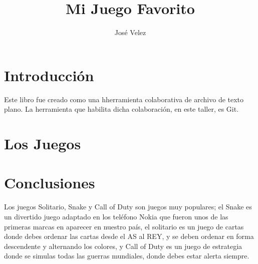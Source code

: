 \documentclass[12pt,oneside]{book}
\title{Mi Juego Favorito}
\author{José Velez}
\begin{document}
\maketitle
\tableofcontents

\chapter{Introducción}
Este libro fue creado como una hherramienta colaborativa de archivo de texto plano. La herramienta que habilita dicha colaboración, en este taller, es Git.

\chapter{Los Juegos}





\chapter{Conclusiones}
Los juegos Solitario, Snake y Call of Duty son juegos muy populares; el Snake es un divertido juego adaptado en los teléfono Nokia que fueron unos de las primeras marcas en aparecer en nuestro país, el solitario es un juego de cartas donde debes ordenar las cartas desde el AS al REY, y se deben ordenar en forma descendente y alternando los colores, y Call of Duty es un juego de estrategia donde se simulas todas las guerras mundiales, donde debes estar alerta siempre.
\end{document}
